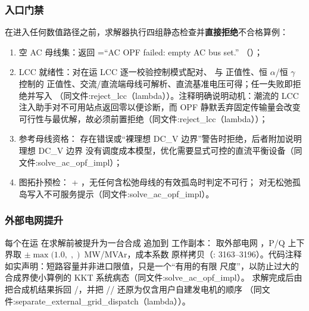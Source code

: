 \subsubsection*{入口门禁}
在进入任何数值路径之前，求解器执行四组静态检查并\textbf{直接拒绝}不合格算例：
\begin{enumerate}
  \item 空 AC 母线集：返回 =``AC OPF failed: empty AC bus set.''
        （）；
  \item LCC 就绪性：对在运 LCC 逐一校验控制模式配对、 与
         正值性、恒 $\alpha$/恒 $\gamma$ 控制的 
        正值性、交流/直流端母线可解析、直流基准电压可得；任一失败即拒绝并写入
        （同文件:reject\_lcc（lambda））。注释明确说明动机：潮流的
        LCC 注入助手对不可用站点返回零以便诊断，而 OPF 静默丢弃固定传输量会改变
        可行性与最优解，故必须前置拒绝（同文件:reject\_lcc（lambda））；
  \item 参考母线资格：
        存在错误或``裸理想 DC\_V 边界''警告时拒绝，后者附加说明理想 DC\_V 边界
        没有调度成本模型，优化需要显式可控的直流平衡设备（同文件:solve\_ac\_opf\_impl）；
  \item 图拓扑预检： +
        ，无任何含松弛母线的有效孤岛时判定不可行；
        对无松弛孤岛写入不可服务提示（同文件:solve\_ac\_opf\_impl）。
\end{enumerate}

\subsubsection*{外部电网提升}
每个在运  在求解前被提升为一台合成  追加到
工作副本： 取外部电网 ，P/Q 上下界取
$\pm\max(1.0,\;$$,\;$$)$~MW/MVAr，成本系数
 原样拷贝（:
3163--3196）。代码注释如实声明：短路容量并非进口限值，只是一个``有用的有限
尺度''，以防止过大的合成界使小算例的 KKT 系统病态（同文件:solve\_ac\_opf\_impl）。
求解完成后由  把合成机结果拆回
/，并把
// 还原为仅含用户自建发电机的顺序
（同文件:separate\_external\_grid\_dispatch（lambda））。


